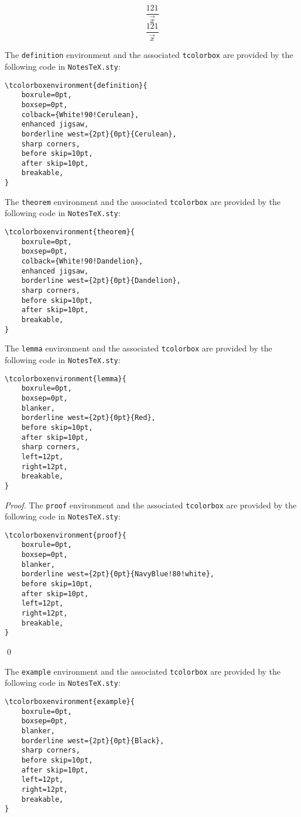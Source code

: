 \documentclass[10pt]{article}
\begin{document}
	\begin{equation}
	\frac{121}{\vec{x}}
	\end{equation}
	\begin{equation}
	\frac{121}{\vec{x}}
	\end{equation}
	\begin{definition}
		The \texttt{definition} environment and the associated \texttt{tcolorbox} are provided by the following code in \texttt{NotesTeX.sty}:
		\begin{lstlisting}[language={[LaTeX]TeX}]
\tcolorboxenvironment{definition}{
	boxrule=0pt,
	boxsep=0pt,
	colback={White!90!Cerulean},
	enhanced jigsaw,
	borderline west={2pt}{0pt}{Cerulean},
	sharp corners,
	before skip=10pt,
	after skip=10pt,
	breakable,
}
		\end{lstlisting}
	\end{definition}
	\begin{theorem}
		The \texttt{theorem} environment and the associated \texttt{tcolorbox} are provided by the following code in \texttt{NotesTeX.sty}:
		\begin{lstlisting}
\tcolorboxenvironment{theorem}{
	boxrule=0pt,
	boxsep=0pt,
	colback={White!90!Dandelion},
	enhanced jigsaw,
	borderline west={2pt}{0pt}{Dandelion},
	sharp corners,
	before skip=10pt,
	after skip=10pt,
	breakable,
}
		\end{lstlisting}
	\end{theorem}
	\begin{lemma}
		The \texttt{lemma} environment and the associated \texttt{tcolorbox} are provided by the following code in \texttt{NotesTeX.sty}:
		\begin{lstlisting}
\tcolorboxenvironment{lemma}{
	boxrule=0pt,
	boxsep=0pt,
	blanker,
	borderline west={2pt}{0pt}{Red},
	before skip=10pt,
	after skip=10pt,
	sharp corners,
	left=12pt,
	right=12pt,
	breakable,
}
		\end{lstlisting}
	\end{lemma}
	\begin{proof}
		The \texttt{proof} environment and the associated \texttt{tcolorbox} are provided by the following code in \texttt{NotesTeX.sty}:
		\begin{lstlisting}
\tcolorboxenvironment{proof}{
	boxrule=0pt,
	boxsep=0pt,
	blanker,
	borderline west={2pt}{0pt}{NavyBlue!80!white},
	before skip=10pt,
	after skip=10pt,
	left=12pt,
	right=12pt,
	breakable,
}
		\end{lstlisting}
		\qed
	\end{proof}
	\begin{example}
		The \texttt{example} environment and the associated \texttt{tcolorbox} are provided by the following code in \texttt{NotesTeX.sty}:
		\begin{lstlisting}
\tcolorboxenvironment{example}{
	boxrule=0pt,
	boxsep=0pt,
	blanker,
	borderline west={2pt}{0pt}{Black},
	sharp corners,
	before skip=10pt,
	after skip=10pt,
	left=12pt,
	right=12pt,
	breakable,
}
		\end{lstlisting}
	\end{example}
\end{document}
